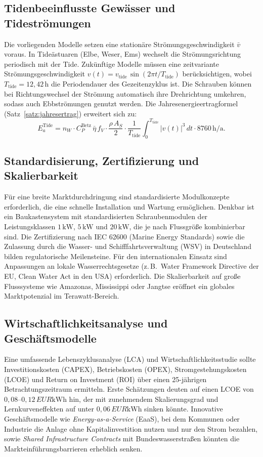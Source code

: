 ﻿\documentclass[a4paper,12pt]{article}
\theoremstyle{definition}
\begin{document}
\subsection{Tidenbeeinflusste Gewässer und Tideströmungen}

Die vorliegenden Modelle setzen eine stationäre Strömungsgeschwindigkeit $\bar{v}$
voraus. In Tideästuaren (Elbe, Weser, Ems) wechselt die Strömungsrichtung periodisch
mit der Tide. Zukünftige Modelle müssen eine zeitvariante Strömungsgeschwindigkeit
$v(t) = v_{\mathrm{tide}}\,\sin(2\pi t/T_{\mathrm{tide}})$ berücksichtigen, wobei
$T_{\mathrm{tide}} = 12{,}42\,\mathrm{h}$ die Periodendauer des Gezeitenzyklus ist.
Die Schrauben können bei Richtungswechsel der Strömung automatisch ihre Drehrichtung
umkehren, sodass auch Ebbströmungen genutzt werden. Die Jahresenergieertragformel
(Satz~\ref{satz:jahresertrag}) erweitert sich zu:
\[
  E_a^{\mathrm{Tide}} = n_W \cdot C_P^{\mathrm{Betz}}\,\bar{\eta}\,f_V \cdot
  \frac{\rho\,A_S}{2} \cdot \frac{1}{T_{\mathrm{tide}}}\int_0^{T_{\mathrm{tide}}}
  \bigl|v(t)\bigr|^3\,dt \cdot 8760\,\mathrm{h/a}.
\]

\subsection{Standardisierung, Zertifizierung und Skalierbarkeit}

Für eine breite Marktdurchdringung sind standardisierte Modulkonzepte erforderlich,
die eine schnelle Installation und Wartung ermöglichen. Denkbar ist ein Baukastensystem
mit standardisierten Schraubenmodulen der Leistungsklassen $1\,\mathrm{kW}$,
$5\,\mathrm{kW}$ und $20\,\mathrm{kW}$, die je nach Flussgröße kombinierbar sind.
Die Zertifizierung nach IEC 62600 (Marine Energy Standards) sowie die Zulassung
durch die Wasser- und Schifffahrtsverwaltung (WSV) in Deutschland bilden regulatorische
Meilensteine. Für den internationalen Einsatz sind Anpassungen an lokale
Wasserrechtsgesetze (z.\,B.\ Water Framework Directive der EU, Clean Water Act in
den USA) erforderlich. Die Skalierbarkeit auf große Flusssysteme wie Amazonas,
Mississippi oder Jangtse eröffnet ein globales Marktpotenzial im Terawatt-Bereich.

\subsection{Wirtschaftlichkeitsanalyse und Geschäftsmodelle}

Eine umfassende Lebenszyklusanalyse (LCA) und Wirtschaftlichkeitsstudie sollte
Investitionskosten (CAPEX), Betriebskosten (OPEX), Stromgestehungskosten (LCOE)
und Return on Investment (ROI) über einen 25-jährigen Betrachtungszeitraum ermitteln.
Erste Schätzungen deuten auf einen LCOE von $0{,}08$--$0{,}12\,EUR\mathrm{kWh}$
hin, der mit zunehmendem Skalierungsgrad und Lernkurveneffekten auf unter
$0{,}06\,EUR\mathrm{kWh}$ sinken könnte. Innovative Geschäftsmodelle wie
\emph{Energy-as-a-Service} (EaaS), bei dem Kommunen oder Industrie die Anlage
ohne Kapitalinvestition nutzen und nur den Strom bezahlen, sowie
\emph{Shared Infrastructure Contracts} mit Bundeswasserstraßen könnten die
Markteinführungsbarrieren erheblich senken.
\end{document}
